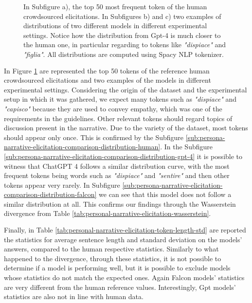 \begin{figure}[!htbp]
    \caption{In Subfigure a), the top 50 most frequent token of the human crowdsourced elicitations. In Subfigures b) and c) two examples of distributions of two different models in different experimental settings. Notice how the distribution from Gpt-4 is much closer to the human one, in particular regarding to tokens like \emph{"dispiace"} and \emph{"figlia"}. All distributions are computed using Spacy NLP tokenizer.}
    \label{fig:persona-narrative-elicitation-comparison-distribution}
\end{figure}

In Figure \ref{fig:persona-narrative-elicitation-comparison-distribution} are represented the top 50 tokens of the reference human crowdsourced elicitations and two examples of the models in different experimental settings. Considering the origin of the dataset and the experimental setup in which it was gathered, we expect many tokens such as \emph{"dispiace"} and \emph{"capisco"} because they are used to convey empathy, which was one of the requirements in the guidelines. Other relevant tokens should regard topics of discussion present in the narrative. Due to the variety of the dataset, most tokens should appear only once. This is confirmed by the Subfigure \ref{sub:persona-narrative-elicitation-comparison-distribution-human}. 
In the Subfigure \ref{sub:persona-narrative-elicitation-comparison-distribution-gpt-4} it is possible to witness that ChatGPT 4 follows a similar distribution curve, with the most frequent tokens being words such as \emph{"dispiace"} and \emph{"sentire"} and then other tokens appear very rarely. 
In Subfigure \ref{sub:persona-narrative-elicitation-comparison-distribution-falcon} we can see that this model does not follow a similar distribution at all. This confirms our findings through the Wasserstein divergence from Table \ref{tab:personal-narrative-elicitation-wasserstein}.

% 
Finally, in Table \ref{tab:personal-narrative-elicitation-token-length-std} are reported the statistics for average sentence length and standard deviation on the models' answers, compared to the human respective statistics. Similarly to what happened to the divergence, through these statistics, it is not possible to determine if a model is performing well, but it is possible to exclude models whose statistics do not match the expected ones. Again Falcon models' statistics are very different from the human reference values. Interestingly, Gpt models' statistics are also not in line with human data. 

